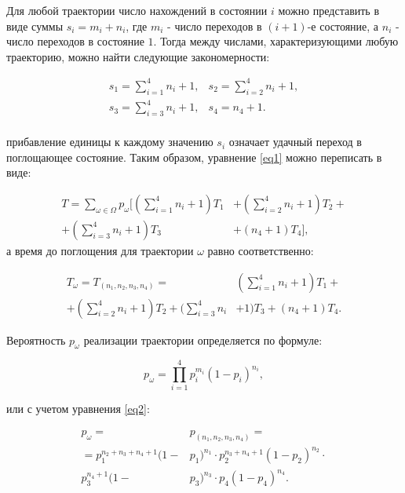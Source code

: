 \documentclass[12pt]{article}
\theoremstyle{definition}
\begin{document}
Для любой траектории число нахождений в состоянии $i$ можно представить в виде суммы $s_i=m_i + n_i$, где $m_i$ - число переходов в $(i+1)$-е состояние, а $n_i$ - число переходов в состояние $1$. Тогда между числами, характеризующими любую траекторию, можно найти следующие закономерности:

\begin{equation}
    \label{eq2}
    \begin{split}
    s_1 = \sum_{i=1}^{4} n_i + 1,& s_2 = \sum_{i=2}^{4} n_i + 1,\\
    s_3 = \sum_{i=3}^{4} n_i + 1,& s_4 = n_4 + 1.\\
    \end{split}
\end{equation}

прибавление единицы к каждому значению $s_i$ означает удачный переход в поглощающее состояние. Таким образом, уравнение \ref{eq1} можно переписать в виде:

\begin{equation}
    \label{eq3}
    \begin{split}
    T = \sum_{\omega \in \Omega} p_{\omega} \big[ (\sum_{i=1}^{4} n_i + 1)T_1 & + (\sum_{i=2}^{4} n_i + 1)T_2 + \\
     +(\sum_{i=3}^{4} n_i + 1)T_3 &+ (n_4 + 1)T_4 \big],
    \end{split}
\end{equation}
а время до поглощения для траектории $\omega$ равно соответственно:

\begin{equation}
    \label{eq4}
    \begin{split}
    T_{\omega} = T_{(n_1,n_2,n_3,n_4)} =& (\sum_{i=1}^{4} n_i + 1)T_1 +\\
     + (\sum_{i=2}^{4} n_i + 1)T_2 + (\sum_{i=3}^{4} n_i & + 1)T_3 + (n_4 + 1)T_4.
    \end{split}
\end{equation}

Вероятность $p_{\omega}$ реализации траектории определяется по формуле:

\begin{equation}
    p_{\omega} = \prod _{i=1}^{4} p_{i}^{m_{i}}(1-p_{i})^{n_{i}},
\end{equation}

или с учетом уравнения \ref{eq2}:

\begin{equation}
    \begin{split}
    p_{\omega} =& p_{(n_1,n_2,n_3,n_4)} = \\ 
    = p_{1}^{n_2 + n_3 + n_4 + 1}(1-&p_1)^{n_1}\cdot p_{2}^{n_3 + n_4 + 1}(1-p_2)^{n_2}\cdot \\
    p_{3}^{n_4 + 1}(1-&p_3)^{n_3}\cdot p_4(1-p_4)^{n_4}.
    \end{split}
\end{equation}
\end{document}
